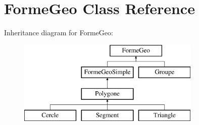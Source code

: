 \hypertarget{class_forme_geo}{}\section{Forme\+Geo Class Reference}
\label{class_forme_geo}
Inheritance diagram for Forme\+Geo\+:\begin{figure}[H]
\begin{center}
\leavevmode
\includegraphics[height=4.000000cm]{dc/de3/class_forme_geo}
\end{center}
\end{figure}
